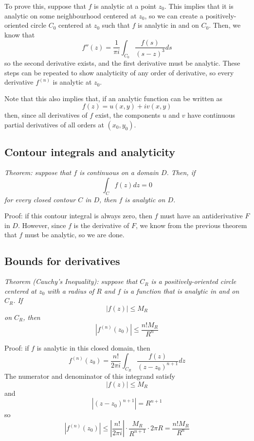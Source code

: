 \documentclass{article}
\begin{document}
To prove this, suppose that $f$ is analytic at a point $z_0$. This implies that it is analytic on some neighbourhood centered at $z_0$, so we can create a positively-oriented circle $C_0$ centered at $z_0$ such that $f$ is analytic in and on $C_0$. Then, we know that
\[
	f''(z) = \frac{1}{\pi i} \int_{C_0} \frac{f(s)}{(s - z)^3} ds
\]
so the second derivative exists, and the first derivative must be analytic. These steps can be repeated to show analyticity of any order of derivative, so every derivative $f^{(n)}$ is analytic at $z_0$.

Note that this also implies that, if an analytic function can be written as
\[
	f(z) = u(x, y) + iv(x, y)
\]
then, since all derivatives of $f$ exist, the components $u$ and $v$ have continuous partial derivatives of all orders at $(x_0, y_0)$.

\subsection{Contour integrals and analyticity} 
\textit{Theorem: suppose that $f$ is continuous on a domain $D$. Then, if
\[
	\int_C f(z) dz = 0
\]
for every closed contour $C$ in $D$, then $f$ is analytic on $D$.}

Proof: if this contour integral is always zero, then $f$ must have an antiderivative $F$ in $D$. However, since $f$ is the derivative of $F$, we know from the previous theorem that $f$ must be analytic, so we are done.

\subsection{Bounds for derivatives}
\textit{Theorem (Cauchy's Inequality): suppose that $C_R$ is a positively-oriented circle centered at $z_0$ with a radius of $R$ and $f$ is a function that is analytic in and on $C_R$. If
\[
	|f(z)| \le M_R
\]
on $C_R$, then
\[
	|f^{(n)}(z_0)| \le \frac{n! M_R}{R^n}
\]}

Proof: if $f$ is analytic in this closed domain, then
\[
	f^{(n)}(z_0) = \frac{n!}{2\pi i} \int_{C_R} \frac{f(z)}{(z - z_0)^{n+1}} dz
\]
The numerator and denominator of this integrand satisfy
\[
	|f(z)| \le M_R
\]
and
\[
	|(z - z_0)^{n+1}| = R^{n+1}
\]
so
\[
	|f^{(n)}(z_0)| 
	\le \left|\frac{n!}{2\pi i}\right| \cdot \frac{M_R}{R^{n+1}} \cdot 2\pi R
	= \frac{n! M_R}{R^n}
\]
\end{document}
